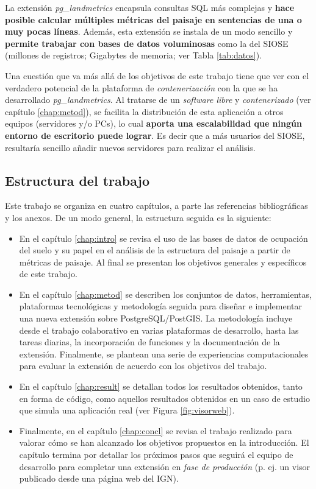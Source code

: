 \begin{prologo}
La extensión \textit{pg\_landmetrics} encapsula consultas SQL más complejas y \textbf{hace posible calcular múltiples métricas del paisaje en sentencias de una o muy pocas líneas}. Además, esta extensión se instala de un modo sencillo y \textbf{permite trabajar con bases de datos voluminosas} como la del SIOSE (millones de registros; Gigabytes de memoria; ver Tabla \ref{tab:datos}). 

Una cuestión que va más allá de los objetivos de este trabajo tiene que ver con el verdadero potencial de la plataforma de \textit{contenerización} con la que se ha desarrollado \textit{pg\_landmetrics}. Al tratarse de un \textit{software libre} y \textit{contenerizado} (ver capítulo \ref{chap:metod}), se facilita la distribución de esta aplicación a otros equipos (servidores y/o PCs), lo cual \textbf{aporta una escalabilidad que ningún entorno de escritorio puede lograr}. Es decir que a más usuarios del SIOSE, resultaría sencillo añadir nuevos servidores para realizar el análisis.

\subsection*{Estructura del trabajo}
Este trabajo se organiza en cuatro capítulos, a parte las referencias bibliográficas y los anexos. De un modo general, la estructura seguida es la siguiente:
\begin{itemize}
\item En el capítulo \ref{chap:intro} se revisa el uso de las bases de datos de ocupación del suelo y su papel en el análisis de la estructura del paisaje a partir de métricas de paisaje. Al final se presentan los objetivos generales y específicos de este trabajo.

\item En el capítulo \ref{chap:metod} se describen los conjuntos de datos, herramientas, plataformas tecnológicas y metodología seguida para diseñar e implementar una nueva extensión sobre PostgreSQL/PostGIS. La metodología incluye desde el trabajo colaborativo en varias plataformas de desarrollo, hasta las tareas diarias, la incorporación de funciones y la documentación de la extensión. Finalmente, se plantean una serie de experiencias computacionales para evaluar la extensión de acuerdo con los objetivos del trabajo.

\item En el capítulo \ref{chap:result} se detallan todos los resultados obtenidos, tanto en forma de código, como aquellos resultados obtenidos en un caso de estudio que simula una aplicación real (ver Figura \ref{fig:visorweb}).

\item Finalmente, en el capítulo \ref{chap:concl} se revisa el trabajo realizado para valorar cómo se han alcanzado los objetivos propuestos en la introducción. El capítulo termina por detallar los próximos pasos que seguirá el equipo de desarrollo para completar una extensión en \textit{fase de producción} (p. ej. un visor publicado desde una página web del IGN).
\end{itemize}



\end{prologo}
